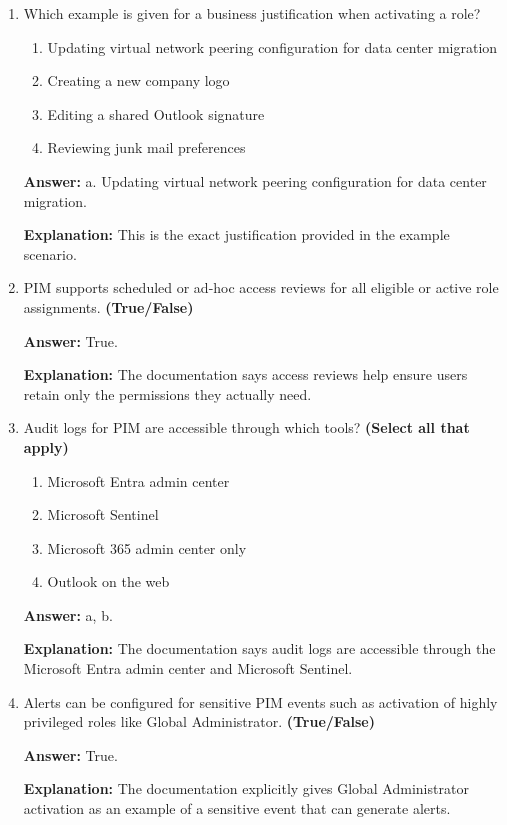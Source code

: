 \documentclass[10pt]{article}
\begin{document}
\begin{enumerate}[leftmargin=*]
\textbf{Explanation:} The documentation says PIM can require MFA, justification, and use approval workflows.

\item Which example is given for a business justification when activating a role?
\begin{enumerate}[label=\alph*., leftmargin=1.5em]
\item Updating virtual network peering configuration for data center migration
\item Creating a new company logo
\item Editing a shared Outlook signature
\item Reviewing junk mail preferences
\end{enumerate}
\textbf{Answer:} a. Updating virtual network peering configuration for data center migration.

\textbf{Explanation:} This is the exact justification provided in the example scenario.

\item PIM supports scheduled or ad-hoc access reviews for all eligible or active role assignments. \textbf{(True/False)}

\textbf{Answer:} True.

\textbf{Explanation:} The documentation says access reviews help ensure users retain only the permissions they actually need.

\item Audit logs for PIM are accessible through which tools? \textbf{(Select all that apply)}
\begin{enumerate}[label=\alph*., leftmargin=1.5em]
\item Microsoft Entra admin center
\item Microsoft Sentinel
\item Microsoft 365 admin center only
\item Outlook on the web
\end{enumerate}
\textbf{Answer:} a, b.

\textbf{Explanation:} The documentation says audit logs are accessible through the Microsoft Entra admin center and Microsoft Sentinel.

\item Alerts can be configured for sensitive PIM events such as activation of highly privileged roles like Global Administrator. \textbf{(True/False)}

\textbf{Answer:} True.

\textbf{Explanation:} The documentation explicitly gives Global Administrator activation as an example of a sensitive event that can generate alerts.


\end{enumerate}
\end{document}
